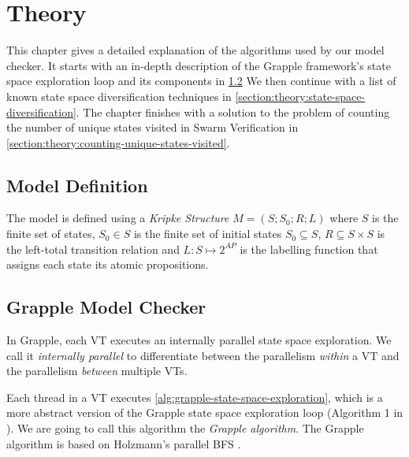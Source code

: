 \documentclass[
fancyheadings, %
%
%
]{stsreprt}
\begin{document}


\chapter{Theory}
\label{chapter:theory}

This chapter gives a detailed explanation of the algorithms used by our model checker.
It starts with an in-depth description of the Grapple framework's state space exploration loop and its components in \cref{section:theory:grapple-model-checker}
We then continue with a list of known state space diversification techniques in \cref{section:theory:state-space-diversification}.
The chapter finishes with a solution to the problem of counting the number of unique states visited in Swarm Verification in \cref{section:theory:counting-unique-states-visited}.


\section{Model Definition}
\label{section:theory:model-definition}

The model is defined using a \emph{Kripke Structure} $M = \left(S; S_0; R; L \right)$ where $S$ is the finite set of states, $S_0 \in S$ is the finite set of initial states $S_0 \subseteq S$, $R \subseteq S \times S$ is the left-total transition relation and $L : S \mapsto 2^{AP}$ is the labelling function that assigns each state its atomic propositions.


\section{Grapple Model Checker}
\label{section:theory:grapple-model-checker}

In Grapple, each VT executes an internally parallel state space exploration.
We call it \emph{internally parallel} to differentiate between the parallelism \emph{within} a VT and the parallelism \emph{between} multiple VTs.

Each thread in a VT executes \cref{alg:grapple-state-space-exploration}, which is a more abstract version of the Grapple state space exploration loop (Algorithm 1 in \cite{DeFrancisco2020.Grapple}).
We are going to call this algorithm the \emph{Grapple algorithm}.
The Grapple algorithm is based on Holzmann's parallel BFS \cite{Holzmann2012.Paralellizing-SPIN}.
\end{document}
